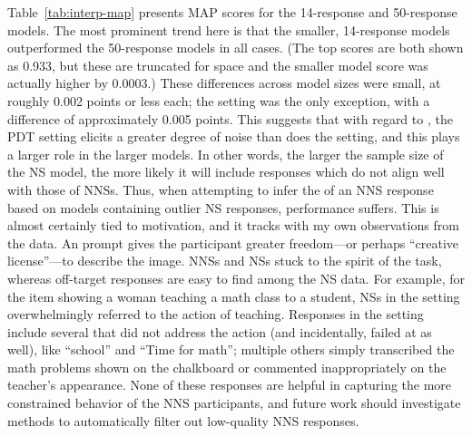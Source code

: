 Table~\ref{tab:interp-map} presents  MAP scores for the 14-response and 50-response  models. The most prominent trend here is that the smaller, 14-response models outperformed the 50-response models in all cases. (The top  scores are both shown as 0.933, but these are truncated for space and the smaller model score was actually higher by 0.0003.) These differences across model sizes were small, at roughly 0.002 points or less each; the  setting was the only exception, with a difference of approximately 0.005 points. This suggests that with regard to , the  PDT setting elicits a greater degree of noise than does the  setting, and this plays a larger role in the larger models. In other words, the larger the sample size of the  NS model, the more likely it will include responses which do not align well with those of NNSs. Thus, when attempting to infer the  of an NNS response based on models containing outlier NS responses, performance suffers. This is almost certainly tied to motivation, and it tracks with my own observations from the data. An  prompt gives the participant greater freedom---or perhaps ``creative license''---to describe the image. NNSs and  NSs  stuck to the spirit of the task, whereas off-target responses are easy to find among the  NS data. For example, for the item showing a woman teaching a math class to a student,  NSs in the  setting overwhelmingly referred to the action of teaching. Responses in the  setting include several that did not address the action (and incidentally, failed at  as well), like ``school'' and ``Time for math''; multiple others simply transcribed the math problems shown on the chalkboard or commented inappropriately on the teacher's appearance. None of these responses are helpful in capturing the more constrained behavior of the NNS participants, and future work should investigate methods to automatically filter out low-quality NNS responses.


